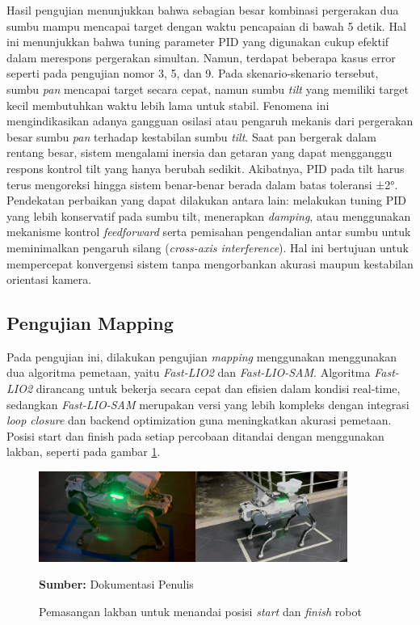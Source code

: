 Hasil pengujian menunjukkan bahwa sebagian besar kombinasi pergerakan dua sumbu mampu
mencapai target dengan waktu pencapaian di bawah 5 detik. Hal ini menunjukkan
bahwa tuning parameter PID yang digunakan cukup efektif dalam merespons
pergerakan simultan. Namun, terdapat beberapa kasus error seperti pada pengujian
nomor 3, 5, dan 9. Pada skenario-skenario tersebut, sumbu \emph{pan} mencapai
target secara cepat, namun sumbu \emph{tilt} yang memiliki target kecil
membutuhkan waktu lebih lama untuk stabil. Fenomena ini mengindikasikan adanya gangguan
osilasi atau pengaruh mekanis dari pergerakan besar sumbu \emph{pan} terhadap
kestabilan sumbu \emph{tilt}. Saat pan bergerak dalam rentang besar, sistem mengalami
inersia dan getaran yang dapat mengganggu respons kontrol tilt yang hanya berubah
sedikit. Akibatnya, PID pada tilt harus terus mengoreksi hingga sistem benar-benar
berada dalam batas toleransi ±2°. Pendekatan perbaikan yang dapat dilakukan
antara lain: melakukan tuning PID yang lebih konservatif pada sumbu tilt,
menerapkan \emph{damping}, atau menggunakan mekanisme kontrol \emph{feedforward}
serta pemisahan pengendalian antar sumbu untuk meminimalkan pengaruh silang (\emph{cross-axis
interference}). Hal ini bertujuan untuk mempercepat konvergensi sistem tanpa mengorbankan
akurasi maupun kestabilan orientasi kamera.

\subsection{Pengujian Mapping}
Pada pengujian ini, dilakukan pengujian \emph{mapping} menggunakan menggunakan dua
algoritma pemetaan, yaitu \emph{Fast-LIO2} dan \emph{Fast-LIO-SAM}. Algoritma \emph{Fast-LIO2}
dirancang untuk bekerja secara cepat dan efisien dalam kondisi real-time, sedangkan
\emph{Fast-LIO-SAM} merupakan versi yang lebih kompleks dengan integrasi \emph{loop
closure} dan backend optimization guna meningkatkan akurasi pemetaan. Posisi
start dan finish pada setiap percobaan ditandai dengan menggunakan lakban, seperti
pada gambar \ref{fig:loop_closure}.
\begin{figure}[H]
	\centering
	\includegraphics[width=0.9\textwidth]{gambar/bab4/map-start.png}
	\caption{Pemasangan lakban untuk menandai posisi \emph{start} dan \emph{finish}
	robot}
	\label{fig:loop_closure} \footnotesize{\textbf{Sumber:} Dokumentasi Penulis}
\end{figure}

